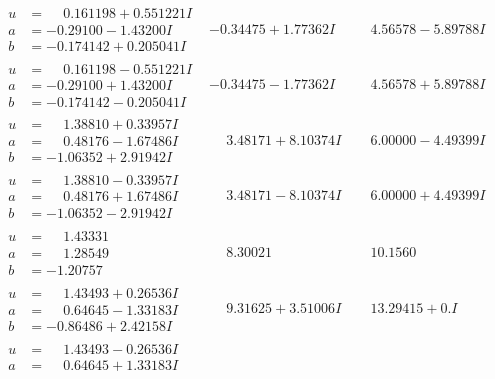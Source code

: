 \documentclass[1p]{elsarticle_modified}
\theoremstyle{definition}
\begin{document}
$$\begin{array}{c|c|c}
\begin{aligned}
u &= \phantom{-}0.161198 + 0.551221 I \\
a &= -0.29100 - 1.43200 I \\
b &= -0.174142 + 0.205041 I\end{aligned}
 & -0.34475 + 1.77362 I & \phantom{-}4.56578 - 5.89788 I \\ \hline\begin{aligned}
u &= \phantom{-}0.161198 - 0.551221 I \\
a &= -0.29100 + 1.43200 I \\
b &= -0.174142 - 0.205041 I\end{aligned}
 & -0.34475 - 1.77362 I & \phantom{-}4.56578 + 5.89788 I \\ \hline\begin{aligned}
u &= \phantom{-}1.38810 + 0.33957 I \\
a &= \phantom{-}0.48176 - 1.67486 I \\
b &= -1.06352 + 2.91942 I\end{aligned}
 & \phantom{-}3.48171 + 8.10374 I & \phantom{-}6.00000 - 4.49399 I \\ \hline\begin{aligned}
u &= \phantom{-}1.38810 - 0.33957 I \\
a &= \phantom{-}0.48176 + 1.67486 I \\
b &= -1.06352 - 2.91942 I\end{aligned}
 & \phantom{-}3.48171 - 8.10374 I & \phantom{-}6.00000 + 4.49399 I \\ \hline\begin{aligned}
u &= \phantom{-}1.43331\phantom{ +0.000000I} \\
a &= \phantom{-}1.28549\phantom{ +0.000000I} \\
b &= -1.20757\phantom{ +0.000000I}\end{aligned}
 & \phantom{-}8.30021\phantom{ +0.000000I} & \phantom{-}10.1560\phantom{ +0.000000I} \\ \hline\begin{aligned}
u &= \phantom{-}1.43493 + 0.26536 I \\
a &= \phantom{-}0.64645 - 1.33183 I \\
b &= -0.86486 + 2.42158 I\end{aligned}
 & \phantom{-}9.31625 + 3.51006 I & \phantom{-}13.29415 + 0. I\phantom{ +0.000000I} \\ \hline\begin{aligned}
u &= \phantom{-}1.43493 - 0.26536 I \\
a &= \phantom{-}0.64645 + 1.33183 I \\

\end{aligned}
\end{array}$$
\end{document}
